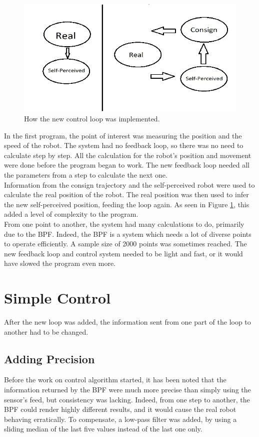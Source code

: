 \begin{figure}[ht]
\centering
\includegraphics{Figures/Loops}
\decoRule
\caption[Direct and controlled loops]{How the new control loop was implemented.}
\label{fig:Loops}
\end{figure}

In the first program, the point of interest was measuring the position and the speed of the robot.
The system had no feedback loop, so there was no need to calculate step by step. All the calculation for the robot's position and movement were done before the program began to work.
The new feedback loop needed all the parameters from a step to calculate the next one.\\

Information from the consign trajectory and the self-perceived robot were used to calculate the real position of the robot.
The real position was then used to infer the new self-perceived position, feeding the loop again.
As seen in Figure \ref{fig:Loops}, this added a level of complexity to the program.\\

From one point to another, the system had many calculations to do, primarily due to the BPF.
Indeed, the BPF is a system which needs a lot of diverse points to operate efficiently. A sample size of 2000 points was sometimes reached.
The new feedback loop and control system needed to be light and fast, or it would have slowed the program even more.\\


\section{Simple Control}
After the new loop was added, the information sent from one part of the loop to another had to be changed.

\subsection{Adding Precision}
Before the work on control algorithm started, it has been noted that the information returned by the BPF were much more precise than simply using the sensor's feed, but consistency was lacking.
Indeed, from one step to another, the BPF could render highly different results, and it would cause the real robot behaving erratically.
To compensate, a low-pass filter was added, by using a sliding median of the last five values instead of the last one only.\\

